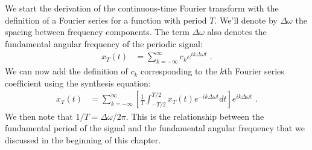 We start the derivation of the continuous-time Fourier transform with the definition of a Fourier series for a function with period $T$. We'll denote by $\Delta \omega$ the spacing between frequency components. The term $\Delta \omega$ also denotes the fundamental angular frequency of the periodic signal:
\begin{align}
x_{T}(t) &= \sum_{k=-\infty}^{\infty} c_k e^{ik\Delta \omega t}  \,\,.
\end{align}
We can now add the definition of $c_k$ corresponding to the $k$th Fourier series coefficient using the synthesis equation:
\begin{align}
x_{T}(t) &= \sum_{k=-\infty}^{\infty} \left[\frac{1}{T}\int_{-T/2}^{T/2} x_{T}(t) e^{-ik\Delta \omega t} dt\right]  e^{ik\Delta \omega t}  \,\,.
\end{align}
We then note that $1/T = \Delta \omega/2\pi$. This is the relationship between the fundamental period of the signal and the fundamental angular frequency that we discussed in the beginning of this chapter.

